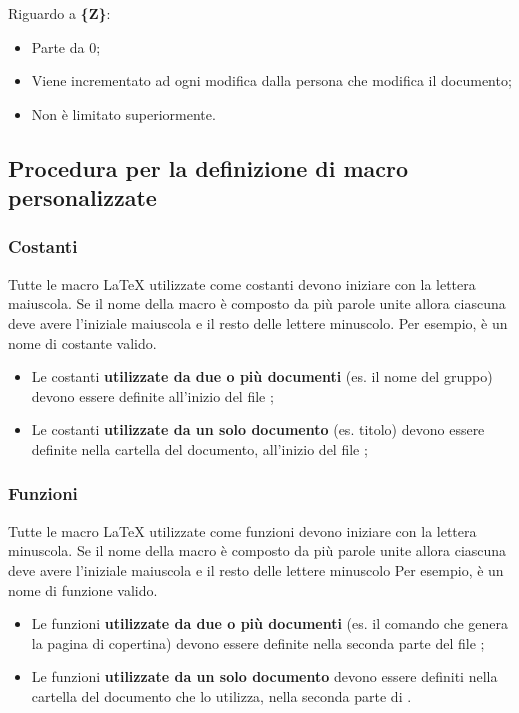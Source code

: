 Riguardo a \textbf{\{Z\}}:
\begin{itemize}
 \item Parte da 0;
 \item Viene incrementato ad ogni modifica dalla persona che modifica il documento;
 \item Non è limitato superiormente.
\end{itemize}


\subsection{Procedura per la definizione di macro personalizzate}

\subsubsection{Costanti}

Tutte le macro \LaTeX{} utilizzate come costanti devono iniziare con la lettera maiuscola. Se il nome della macro è composto da più parole unite allora ciascuna deve avere l'iniziale maiuscola e il resto delle lettere minuscolo. Per esempio,  è un nome di costante valido.

\begin{itemize}
	\item Le costanti \textbf{utilizzate da due o più documenti} (es. il nome del gruppo) devono essere definite all'inizio del file ;
	
	\item Le costanti \textbf{utilizzate da un solo documento} (es. titolo) devono essere definite nella cartella del documento, all'inizio del file ;
\end{itemize}
	
\subsubsection{Funzioni}

Tutte le macro \LaTeX{} utilizzate come funzioni devono iniziare con la lettera minuscola. Se il nome della macro è composto da più parole unite allora ciascuna deve avere l'iniziale maiuscola e il resto delle lettere minuscolo Per esempio,  è un nome di funzione valido.

\begin{itemize}
	\item Le funzioni \textbf{utilizzate da due o più documenti} (es. il comando che genera la pagina di copertina) devono essere definite nella seconda parte del file ;
	
	\item Le funzioni \textbf{utilizzate da un solo documento} devono essere definiti nella cartella del documento che lo utilizza, nella seconda parte di .
\end{itemize}

